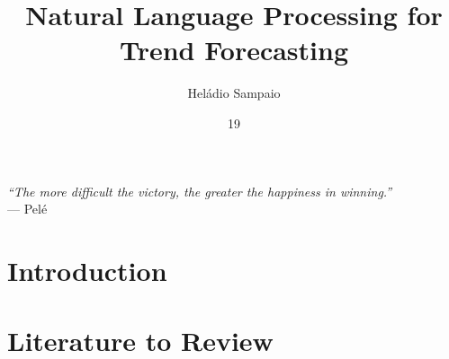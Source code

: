 \documentclass[tg, eng, dv]{ita}    %
\author{Heládio Sampaio}{Lopes}
\title{Natural Language Processing for Trend Forecasting}
\date{19}{JUNE}{2020}
\begin{document}
	
\maketitle

\begin{itadedication}

\end{itadedication}

\begin{itathanks}

\end{itathanks}

\thispagestyle{empty}
\ifhyperref{}\fi
\begin{flushright}
\begin{spacing}{1}
\mbox{}\vfill
{\sffamily\itshape
``The more difficult the victory, the greater the happiness in winning.''\\}
--- Pel\'e \textsc{}
\end{spacing}
\end{flushright}

\begin{abstract}
\noindent

\end{abstract}

\begin{englishabstract}
\noindent

\end{englishabstract}

\listoffigures %

\listoftables %

\listofabbreviations


\tableofcontents

\mainmatter

\chapter{Introduction}\label{chap:intro}


\chapter{Literature to Review}\label{chap:literature}

\end{document}

